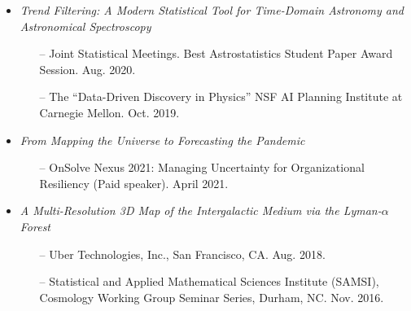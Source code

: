 \documentclass[letterpaper,10pt]{article}
\begin{document}
\begin{itemize}
\vspace{0.15cm}


\item {\it Trend Filtering: A Modern Statistical Tool for Time-Domain Astronomy and Astronomical Spectroscopy}

\begin{itemize}
\item[--] Joint Statistical Meetings. Best Astrostatistics Student Paper Award Session. Aug. 2020.

\vspace{0.05cm}

\item[--] The ``Data-Driven Discovery in Physics'' NSF AI Planning Institute at Carnegie Mellon. Oct. 2019.

\end{itemize}


\vspace{0.15cm}


\item {\it From Mapping the Universe to Forecasting the Pandemic}

\begin{itemize}
\item[--] OnSolve Nexus 2021: {Managing Uncertainty for Organizational Resiliency} (Paid speaker). April 2021.
\end{itemize}


\vspace{0.15cm}


\item {\it A Multi-Resolution 3D Map of the Intergalactic Medium via the Lyman-$\alpha$ Forest}\\

\vspace{-0.5cm}

\begin{itemize}
\item[--] Uber Technologies, Inc., San Francisco, CA. Aug. 2018.

\item[--] Statistical and Applied Mathematical Sciences Institute (SAMSI), Cosmology Working Group Seminar Series, Durham, NC. Nov. 2016.
\end{itemize}


\vspace{0.2cm}



\end{itemize}
\end{document}
